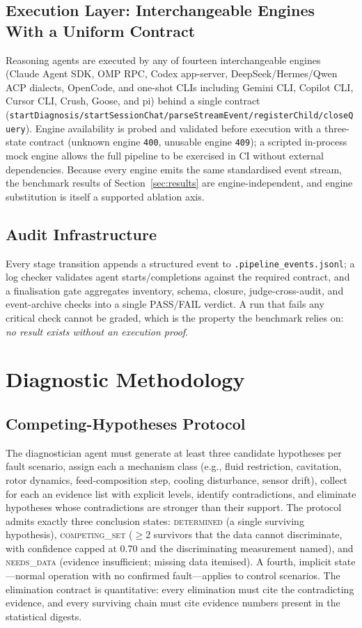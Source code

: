 \documentclass[journal]{IEEEtran}
\begin{document}
\subsection{Execution Layer: Interchangeable Engines With a Uniform Contract}
Reasoning agents are executed by any of fourteen interchangeable engines (Claude Agent SDK, OMP RPC, Codex app-server, DeepSeek/Hermes/Qwen ACP dialects, OpenCode, and one-shot CLIs including Gemini CLI, Copilot CLI, Cursor CLI, Crush, Goose, and pi) behind a single contract (\texttt{startDiagnosis/startSessionChat/parseStreamEvent/registerChild/closeQuery}). Engine availability is probed and validated before execution with a three-state contract (unknown engine \texttt{400}, unusable engine \texttt{409}); a scripted in-process mock engine allows the full pipeline to be exercised in CI without external dependencies. Because every engine emits the same standardised event stream, the benchmark results of Section~\ref{sec:results} are engine-independent, and engine substitution is itself a supported ablation axis.

\subsection{Audit Infrastructure}
Every stage transition appends a structured event to \texttt{.pipeline\_events.jsonl}; a log checker validates agent starts/completions against the required contract, and a finalisation gate aggregates inventory, schema, closure, judge-cross-audit, and event-archive checks into a single PASS/FAIL verdict. A run that fails any critical check cannot be graded, which is the property the benchmark relies on: \emph{no result exists without an execution proof}.

\section{Diagnostic Methodology}
\label{sec:method}

\subsection{Competing-Hypotheses Protocol}
The diagnostician agent must generate at least three candidate hypotheses per fault scenario, assign each a mechanism class (e.g., fluid restriction, cavitation, rotor dynamics, feed-composition step, cooling disturbance, sensor drift), collect for each an evidence list with explicit levels, identify contradictions, and eliminate hypotheses whose contradictions are stronger than their support. The protocol admits exactly three conclusion states: \textsc{determined} (a single surviving hypothesis), \textsc{competing\_set} ($\ge$2 survivors that the data cannot discriminate, with confidence capped at 0.70 and the discriminating measurement named), and \textsc{needs\_data} (evidence insufficient; missing data itemised). A fourth, implicit state---normal operation with no confirmed fault---applies to control scenarios. The elimination contract is quantitative: every elimination must cite the contradicting evidence, and every surviving chain must cite evidence numbers present in the statistical digests.
\end{document}
